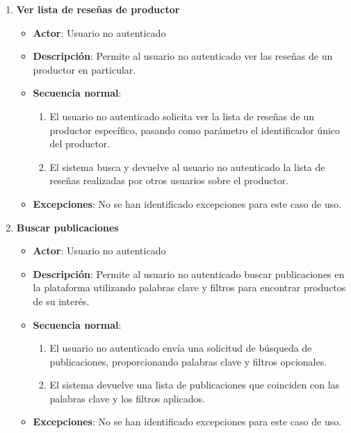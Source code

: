 \begin{enumerate}[label=UC-\protect\twodigits{\arabic*}:, align=left, leftmargin=*]
\item \textbf{Ver lista de reseñas de productor}
\begin{itemize}
\item \textbf{Actor}: Usuario no autenticado
\item \textbf{Descripción}: Permite al usuario no autenticado ver las reseñas de un productor en particular.
\item \textbf{Secuencia normal}:
\begin{enumerate}[label={\arabic*}:]
\item El usuario no autenticado solicita ver la lista de reseñas de un productor específico, pasando como parámetro el identificador único del productor.
\item El sistema busca y devuelve al usuario no autenticado la lista de reseñas realizadas por otros usuarios sobre el productor.
\end{enumerate}
\item \textbf{Excepciones}: No se han identificado excepciones para este caso de uso.
\end{itemize}

\item \textbf{Buscar publicaciones}
\begin{itemize}
\item \textbf{Actor}: Usuario no autenticado
\item \textbf{Descripción}: Permite al usuario no autenticado buscar publicaciones en la plataforma utilizando palabras clave y filtros para encontrar productos de su interés.
\item \textbf{Secuencia normal}:
\begin{enumerate}[label={\arabic*}:]
\item El usuario no autenticado envía una solicitud de búsqueda de publicaciones, proporcionando palabras clave y filtros opcionales.
\item El sistema devuelve una lista de publicaciones que coinciden con las palabras clave y los filtros aplicados.
\end{enumerate}
\item \textbf{Excepciones}: No se han identificado excepciones para este caso de uso.
\end{itemize}



\end{enumerate}
